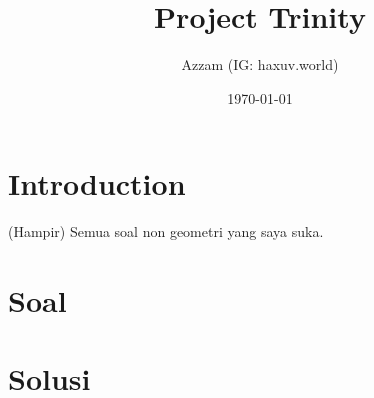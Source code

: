 

\title{Project Trinity}
\author{Azzam (IG: haxuv.world)}
\date{\today}



\maketitle

\section{Introduction}
(Hampir) Semua soal non geometri yang saya suka. 

\section{Soal}


\newpage
\section{Solusi}



